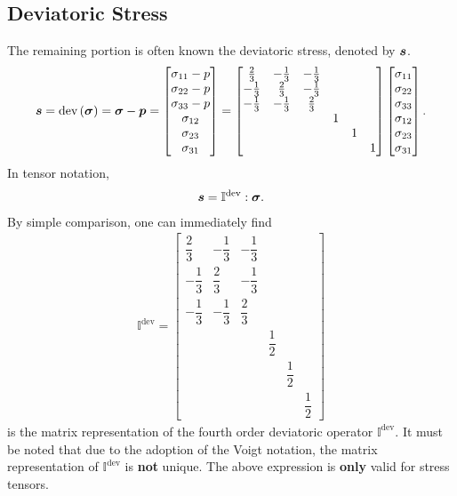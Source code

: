 \subsection{Deviatoric Stress}
The remaining portion is often known the deviatoric stress, denoted by $\bm{s}$.
\begin{gather}
\bm{s}=\text{dev}\left(\bm{\sigma}\right)=\bm{\sigma}-\bm{p}=\begin{bmatrix}
\sigma_{11}-p\\\sigma_{22}-p\\\sigma_{33}-p\\\sigma_{12}\\\sigma_{23}\\\sigma_{31}
\end{bmatrix}=\begin{bmatrix}
\frac{2}{3}&-\frac{1}{3}&-\frac{1}{3}&&&\\
-\frac{1}{3}&\frac{2}{3}&-\frac{1}{3}&&&\\
-\frac{1}{3}&-\frac{1}{3}&\frac{2}{3}&&&\\
&&&1&&\\
&&&&1&\\
&&&&&1
\end{bmatrix}\begin{bmatrix}
\sigma_{11}\\\sigma_{22}\\\sigma_{33}\\\sigma_{12}\\\sigma_{23}\\\sigma_{31}
\end{bmatrix}.
\end{gather}
In tensor notation,
\begin{gather}
\bm{s}=\mathbb{I}^\text{dev}:\bm{\sigma}.
\end{gather}
By simple comparison, one can immediately find
\begin{gather}
\mathbb{I}^\text{dev}=\begin{bmatrix}
\dfrac{2}{3}&-\dfrac{1}{3}&-\dfrac{1}{3}&&&\\[2mm]
-\dfrac{1}{3}&\dfrac{2}{3}&-\dfrac{1}{3}&&&\\[2mm]
-\dfrac{1}{3}&-\dfrac{1}{3}&\dfrac{2}{3}&&&\\[2mm]
&&&\dfrac{1}{2}&&\\[2mm]
&&&&\dfrac{1}{2}&\\[2mm]
&&&&&\dfrac{1}{2}
\end{bmatrix}
\end{gather}
is the matrix representation of the fourth order deviatoric operator $\mathbb{I}^\text{dev}$.
It must be noted that due to the adoption of the Voigt notation, the matrix representation of $\mathbb{I}^\text{dev}$ is \textbf{not} unique.
The above expression is \textbf{only} valid for stress tensors.

